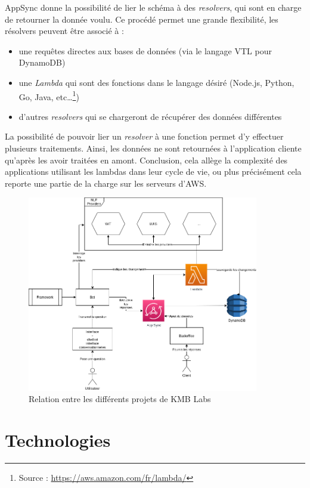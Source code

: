 \documentclass[12pt,a4paper,oneside]{scrreprt}
\begin{document}
AppSync donne la possibilité de lier le schéma à des \textit{resolvers}, qui sont en charge de retourner la donnée voulu. Ce procédé permet une grande flexibilité, les résolvers peuvent être associé à :
\begin{itemize}
	\item une requêtes directes aux bases de données (via le langage VTL pour DynamoDB)
	\item une \textit{Lambda} qui sont des fonctions dans le langage désiré (Node.js, Python, Go, Java, etc\dots\footnote{Source : \url{https://aws.amazon.com/fr/lambda/}})
	\item d'autres \textit{resolvers} qui se chargeront de récupérer des données différentes
\end{itemize}

La possibilité de pouvoir lier un \textit{resolver} à une fonction permet d'y effectuer plusieurs traitements. Ainsi, les données ne sont retournées à l'application cliente qu'après les avoir traitées en amont. Conclusion, cela allège la complexité des applications utilisant les lambdas dans leur cycle de vie, ou plus précisément cela reporte une partie de la charge sur les serveurs d'AWS.

\begin{figure}[!ht]
	\centering
	\includegraphics[width=0.9\textwidth]{pictures/kmb_univers.png}
	\caption{Relation entre les différents projets de KMB Labs}
\end{figure}

\section{Technologies}
\end{document}
